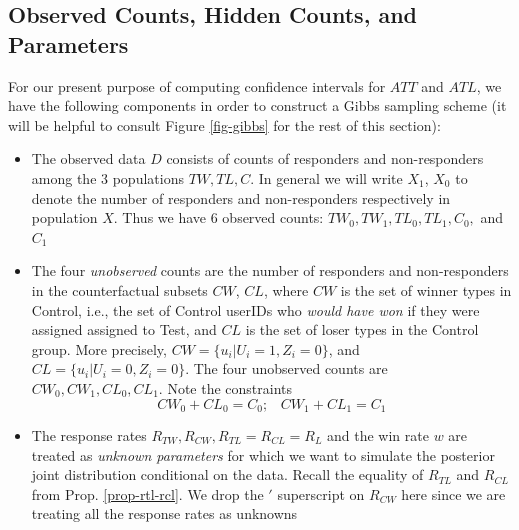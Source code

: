 \documentclass[11pt,a4paper]{article}
\theoremstyle{definition}
\theoremstyle{remark}
\theoremstyle{definition}
\theoremstyle{definition}
\theoremstyle{definition}
\theoremstyle{definition}
\theoremstyle{definition}
\theoremstyle{definition}
\begin{document}
\subsection{Observed Counts, Hidden Counts, and Parameters}
For our present purpose of computing confidence intervals for $ATT$ and $ATL$, we have the following components in order to construct a Gibbs sampling scheme (it will be helpful to consult Figure \ref{fig-gibbs} for the rest of this section):
\begin{itemize}
	\item The observed data $D$ consists of counts of responders and non-responders among the 3 populations $TW, TL, C$. In general we will write $X_1$, $X_0$ to denote the number of responders and non-responders respectively in population $X$. Thus we have 6 observed counts: $TW_0,TW_1, TL_0, TL_1, C_0,$ and $C_1$
	\item The four \textit{unobserved} counts are the number of responders and non-responders in the counterfactual subsets $CW$, $CL$, where $CW$ is the set of winner types in Control, i.e., the set of Control userIDs who \textit{would have won} if they were assigned assigned to Test, and 
$CL$ is the set of loser types in the Control group. More precisely, 
$CW = \{u_i | U_i=1, Z_i=0\}$, and 
$CL = \{u_i | U_i=0, Z_i=0\}$. The four unobserved counts are $CW_0, CW_1, CL_0, CL_1$. Note the constraints
\begin{equation} \label{eq-cw-cl}
	CW_0 + CL_0 = C_0; \;\;\; CW_1 + CL_1 = C_1
\end{equation}
	\item The response rates $R_{TW}, R_{CW}, R_{TL}=R_{CL}=R_L$ 
and the win rate $w$ are treated as \textit{unknown parameters} 
for which we want to simulate the posterior joint distribution conditional on the data. Recall the equality of $R_{TL}$ and $R_{CL}$ from Prop. \ref{prop-rtl-rcl}. We drop the $'$ superscript on $R_{CW}$ here since we are treating all the response rates as unknowns
\end{itemize}
\end{document}
